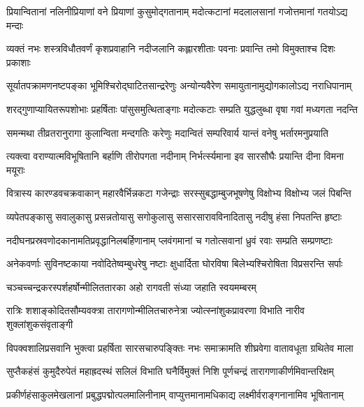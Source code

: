 \twolineshloka
{प्रियान्वितानां नलिनीप्रियाणां वने प्रियाणां कुसुमोद्गतानाम्}
{मदोत्कटानां मदलालसानां गजोत्तमानां गतयोऽद्य मन्दाः} %

\twolineshloka
{व्यक्तं नभः शस्त्रविधौतवर्णं कृशप्रवाहानि नदीजलानि}
{कह्लारशीताः पवनाः प्रवान्ति तमो विमुक्ताश्च दिशः प्रकाशाः} %

\twolineshloka
{सूर्यातपक्रामणनष्टपङ्का भूमिश्चिरोद्घाटितसान्द्ररेणुः}
{अन्योन्यवैरेण समायुतानामुद्योगकालोऽद्य नराधिपानाम्} %

\twolineshloka
{शरद्गुणाप्यायितरूपशोभाः प्रहर्षिताः पांसुसमुत्थिताङ्गाः}
{मदोत्कटाः सम्प्रति युद्धलुब्धा वृषा गवां मध्यगता नदन्ति} %

\twolineshloka
{समन्मथा तीव्रतरानुरागा कुलान्विता मन्दगतिः करेणुः}
{मदान्वितं सम्परिवार्य यान्तं वनेषु भर्तारमनुप्रयाति} %

\twolineshloka
{त्यक्त्वा वराण्यात्मविभूषितानि बर्हाणि तीरोपगता नदीनाम्}
{निर्भर्त्स्यमाना इव सारसौघैः प्रयान्ति दीना विमना मयूराः} %

\twolineshloka
{वित्रास्य कारण्डवचक्रवाकान् महारवैर्भिन्नकटा गजेन्द्राः}
{सरस्सुबद्धाम्बुजभूषणेषु विक्षोभ्य विक्षोभ्य जलं पिबन्ति} %

\twolineshloka
{व्यपेतपङ्कासु सवालुकासु प्रसन्नतोयासु सगोकुलासु}
{ससारसारावविनादितासु नदीषु हंसा निपतन्ति हृष्टाः} %

\twolineshloka
{नदीघनप्रस्रवणोदकानामतिप्रवृद्धानिलबर्हिणानाम्}
{प्लवंगमानां च गतोत्सवानां ध्रुवं रवाः सम्प्रति सम्प्रणष्टाः} %

\twolineshloka
{अनेकवर्णाः सुविनष्टकाया नवोदितेष्वम्बुधरेषु नष्टाः}
{क्षुधार्दिता घोरविषा बिलेभ्यश्चिरोषिता विप्रसरन्ति सर्पाः} %

\twolineshloka
{चञ्चच्चन्द्रकरस्पर्शहर्षोन्मीलिततारका}
{अहो रागवती संध्या जहाति स्वयमम्बरम्} %

\twolineshloka
{रात्रिः शशाङ्कोदितसौम्यवक्त्रा तारागणोन्मीलितचारुनेत्रा}
{ज्योत्स्नांशुकप्रावरणा विभाति नारीव शुक्लांशुकसंवृताङ्गी} %

\twolineshloka
{विपक्वशालिप्रसवानि भुक्त्वा प्रहर्षिता सारसचारुपङ्क्तिः}
{नभः समाक्रामति शीघ्रवेगा वातावधूता ग्रथितेव माला} %

\twolineshloka
{सुप्तैकहंसं कुमुदैरुपेतं महाह्रदस्थं सलिलं विभाति}
{घनैर्विमुक्तं निशि पूर्णचन्द्रं तारागणाकीर्णमिवान्तरिक्षम्} %

\twolineshloka
{प्रकीर्णहंसाकुलमेखलानां प्रबुद्धपद्मोत्पलमालिनीनाम्}
{वाप्युत्तमानामधिकाद्य लक्ष्मीर्वराङ्गनानामिव भूषितानाम्} %

